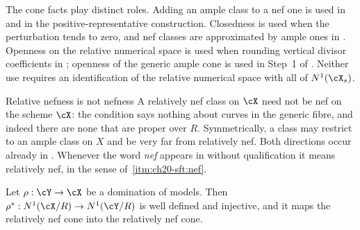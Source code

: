 \begin{remark}
\label{rem:ch20-cone-facts}
The cone facts play distinct roles.  Adding an ample class to a nef one
is used in  and in
the positive-representative construction.  Closedness is used when the
perturbation tends to zero, and nef classes are approximated by ample
ones in .  Openness on the relative numerical
space is used when rounding vertical divisor coefficients in
; openness of the
generic ample cone is used in Step~1 of
.  Neither use requires an
identification of the relative numerical space with all of
\(N^1(\cX_s)\).
\end{remark}

\begin{warning}{Relative nefness is not nefness}
A relatively nef class on \(\cX\) need not be nef on the scheme \(\cX\): the
condition says nothing about curves in the generic fibre, and indeed there
are none that are proper over \(R\).  Symmetrically, a class may restrict to
an ample class on \(X\) and be very far from relatively nef.  Both
directions occur already in .  Whenever the
word \emph{nef} appears in 
without qualification it means relatively nef, in the sense of
\,\cref{itm:ch20-sft:nef}.
\end{warning}

\begin{lemma}
\label{lem:ch20-pullback-injective}
Let \(\rho:\cY\to\cX\) be a domination of models.  Then
\(\rho^*:N^1(\cX/R)\to N^1(\cY/R)\) is well defined and injective, and it
maps the relatively nef cone into the relatively nef cone.
\end{lemma}

